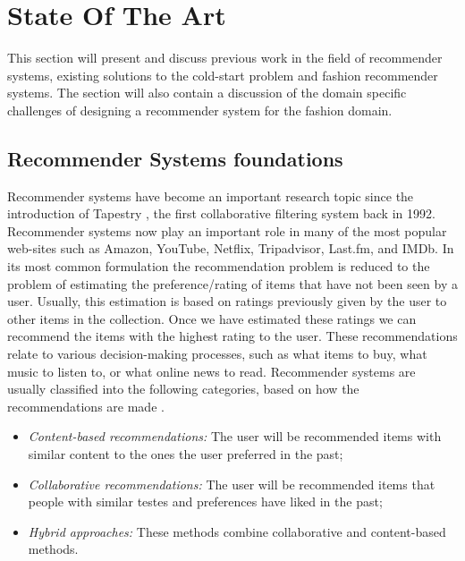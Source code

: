 
\section{State Of The Art}
\label{sec:SotA}

This section will present and discuss previous work in the field of recommender systems, existing solutions to the cold-start problem and fashion recommender systems. The section will also contain a discussion of the domain specific challenges of designing a recommender system for the fashion domain.

\subsection{Recommender Systems foundations}



Recommender systems have become an important research topic since the introduction of Tapestry \cite{Goldberg1992}, the first collaborative filtering system back in 1992. Recommender systems now play an important role in many of the most popular web-sites such as Amazon, YouTube, Netflix, Tripadvisor, Last.fm, and IMDb. In its most common formulation the recommendation problem is reduced to the problem of estimating the preference/rating of items that have not been seen by a user. Usually, this estimation is based on ratings previously given by the user to other items in the collection. Once we have estimated these ratings we can recommend the items with the highest rating to the user. These recommendations relate to various decision-making processes, such as what items to buy, what music to listen to, or what online news to read. Recommender systems are usually classified into the following categories, based on how the recommendations are made \cite{Adomavicius2005}.

\begin{itemize}
\item \emph{Content-based recommendations:} The user will be recommended items with similar content to the ones the user preferred in the past;
\item \emph{Collaborative recommendations:} The user will be recommended items that people with similar testes and preferences have liked in the past;
\item \emph{Hybrid approaches:} These methods combine collaborative and content-based methods.
\end{itemize}

